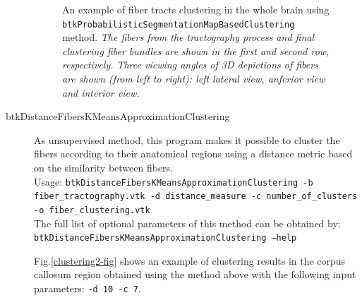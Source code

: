 \begin{description}
\begin{figure}[h]
        \caption{An example of fiber tracts clustering in the whole brain using \texttt{btkProbabilisticSegmentationMapBasedClustering} method.
        {\em The fibers from the tractography process and final clustering fiber bundles are shown in the first and second row, respectively. Three viewing angles of 3D depictions of fibers are shown (from left to right): left lateral view, anferior view and interior view. }}
        \label{clustering1-fig}
        \end{figure}

	\item[btkDistanceFibersKMeansApproximationClustering] As unsupervised method, this program makes it possible to cluster the fibers according to their anatomical regions using a distance metric based on the similarity between fibers.\\

	Usage: \texttt{btkDistanceFibersKMeansApproximationClustering -b fiber\_tractography.vtk -d distance\_measure -c number\_of\_clusters -o fiber\_clustering.vtk} \\

	The full list of optional parameters of this method can be obtained by:\\ 
        \texttt{btkDistanceFibersKMeansApproximationClustering --help}

	Fig.\ref{clustering2-fig} shows an example of clustering results in the corpus callosum region obtained using the method above with the following input parameters: \texttt{-d 10 -c 7}.


\end{description}
